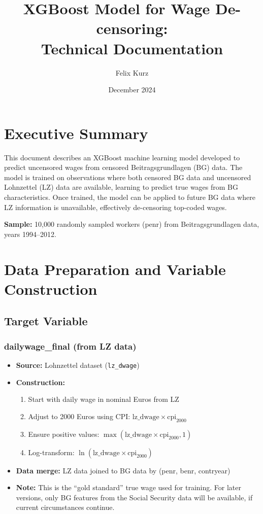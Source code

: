 \documentclass{article}
\title{XGBoost Model for Wage De-censoring:\\Technical Documentation}
\author{Felix Kurz}
\date{December 2024}
\begin{document}
\maketitle

\tableofcontents
\newpage

\section{Executive Summary}

This document describes an XGBoost machine learning model developed to predict uncensored wages from censored Beitragsgrundlagen (BG) data. The model is trained on observations where both censored BG data and uncensored Lohnzettel (LZ) data are available, learning to predict true wages from BG characteristics. Once trained, the model can be applied to future BG data where LZ information is unavailable, effectively de-censoring top-coded wages.

\textbf{Sample:} 10,000 randomly sampled workers (penr) from Beitragsgrundlagen data, years 1994--2012.

\section{Data Preparation and Variable Construction}

\subsection{Target Variable}

\subsubsection{dailywage\_final (from LZ data)}

\begin{itemize}
    \item \textbf{Source:} Lohnzettel dataset (\texttt{lz\_dwage})
    \item \textbf{Construction:}
    \begin{enumerate}
        \item Start with daily wage in nominal Euros from LZ
        \item Adjust to 2000 Euros using CPI: $\text{lz\_dwage} \times \text{cpi}_{2000}$
        \item Ensure positive values: $\max(\text{lz\_dwage} \times \text{cpi}_{2000}, 1)$
        \item Log-transform: $\ln(\text{lz\_dwage} \times \text{cpi}_{2000})$
    \end{enumerate}
    \item \textbf{Data merge:} LZ data joined to BG data by (penr, benr, contryear)
    \item \textbf{Note:} This is the ``gold standard'' true wage used for training. For later versions, only BG features from the Social Security data will be available, if current circumstances continue.
\end{itemize}
\end{document}
